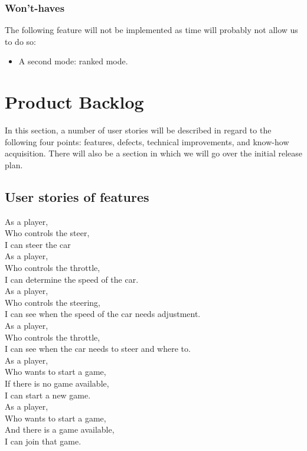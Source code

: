 \documentclass[11pt,twoside,a4paper]{article}
\begin{document}
\subsubsection{Won't-haves}
The following feature will not be implemented as time will probably not allow us to do so:

\begin{itemize}
  \item A second mode: ranked mode.
\end{itemize}


\section{Product Backlog}
In this section, a number of user stories will be described in regard to the following four points: features, defects, technical improvements, and know-how acquisition. There will also be a section in which we will go over the initial release plan.


\subsection{User stories of features}
As a player,\\
Who controls the steer,\\
I can steer the car\\

\noindent
As a player,\\
Who controls the throttle,\\
I can determine the speed of the car.\\

\noindent
As a player,\\
Who controls the steering,\\
I can see when the speed of the car needs adjustment.\\

\noindent
As a player,\\
Who controls the throttle,\\
I can see when the car needs to steer and where to.\\

\noindent
As a player,\\
Who wants to start a game,\\
If there is no game available,\\
I can start a new game.\\

\noindent
As a player,\\
Who wants to start a game,\\
And there is a game available,\\
I can join that game.\\
\end{document}
